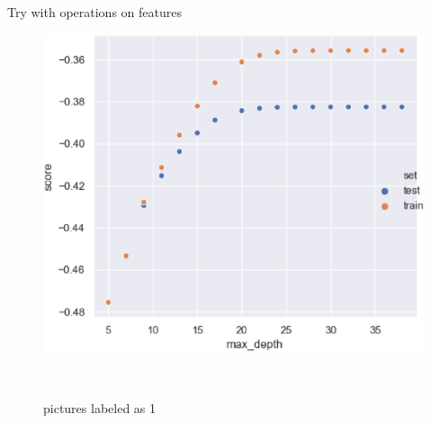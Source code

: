 \documentclass[
 size=12pt,
 paper=smartboard, %
 mode=present, %
 display=slides, %
style=tuliplab,
pauseslide,
fleqn,leqno]{powerdot}
\begin{document}
\begin{slide}{Try with operations on features}
\begin{itemize}
\begin{itemize}
\begin{figure}[h]
\begin{minipage}[t]{0.4\linewidth}
          \includegraphics[width=1.0\textwidth]{figures2/max_depth_score.eps}
          \caption{pictures labeled as 1}
          \label{fig:rfr-max-depth}
        \end{minipage} 
      \end{figure}
    \end{itemize}
  \end{itemize}
\end{slide}
\end{document}
